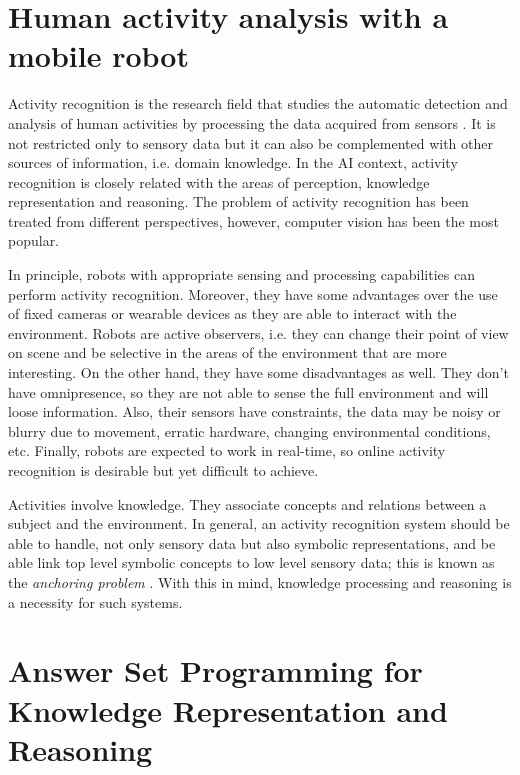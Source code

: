 \section{Human activity analysis with a mobile robot}
Activity recognition is the research field that studies the automatic detection and analysis of human activities by processing the data acquired from sensors \citep{Aggarwal14_HumActRec3DRev}. 
It is not restricted only to sensory data but it can also be complemented with other sources of information, i.e. domain knowledge.
In the AI context, activity recognition is closely related with the areas of perception, knowledge representation and reasoning. 
The problem of activity recognition has been treated from different perspectives, however, computer vision has been the most popular.

In principle, robots with appropriate sensing and processing capabilities can perform activity recognition. 
Moreover, they have some advantages over the use of fixed cameras or wearable devices as they are able to interact with the environment. 
Robots are active observers, i.e. they can change their point of view on scene and be selective in the areas of the environment that are more interesting. 
On the other hand, they have some disadvantages as well. 
They don't have omnipresence, so they are not able to sense the full environment and will loose information.
Also, their sensors have constraints, the data may be noisy or blurry due to movement, erratic hardware, changing environmental conditions, etc. 
Finally, robots are expected to work in real-time, so online activity recognition is desirable but yet difficult to achieve.

Activities involve knowledge.
They associate concepts and relations between a subject and the environment.
In general, an activity recognition system should be able to handle, not only sensory data but also symbolic representations, and be able link top level symbolic concepts to low level sensory data; this is known as the \textit{anchoring problem} \citep{Coradeschi03_AnchoringProblem}.
With this in mind, knowledge processing and reasoning is a necessity for such systems.


\section{Answer Set Programming for Knowledge Representation and Reasoning}

